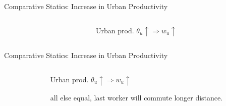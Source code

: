 \documentclass[aspectratio=169]{beamer}
\begin{document}
\begin{frame}{Comparative Statics: Increase in Urban Productivity}

	\begin{columns}
		\begin{column}{0.7\textwidth}
			
		\end{column}
		\begin{column}{0.3\textwidth}
			\begin{midi}
				\item Urban prod. $\theta_u \uparrow \Rightarrow w_u \uparrow$
			\end{midi}
		\end{column}
		\end{columns}
	
	
\end{frame}

\begin{frame}{Comparative Statics: Increase in Urban Productivity}

	\begin{columns}
		\begin{column}{0.7\textwidth}
			
		\end{column}
		\begin{column}{0.3\textwidth}
			\begin{midi}
				\item Urban prod. $\theta_u \uparrow \Rightarrow w_u \uparrow$
				\item all else equal, last worker will commute longer distance.
			\end{midi}
		\end{column}
		\end{columns}
	
	
\end{frame}
\end{document}
